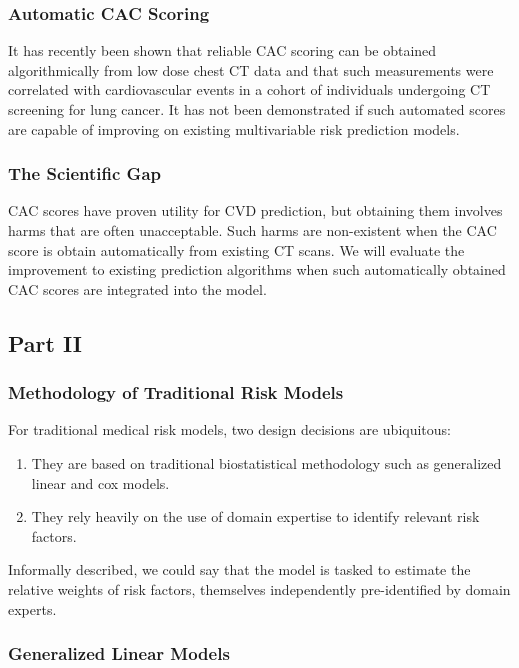 \documentclass[a4paper,12pt]{article}
\begin{document}
			\subsubsection{Automatic CAC Scoring}
			It has recently been shown that reliable CAC scoring can be obtained algorithmically from low dose chest CT data\cite{Isgum2012,Shadmi2018} and that such measurements were correlated with cardiovascular events in a cohort of individuals undergoing CT screening for lung cancer\cite{Takx2015a}. It has not been demonstrated if such automated scores are capable of improving on existing multivariable risk prediction models\cite{Force2018}.
			
			\subsubsection{The Scientific Gap}
			CAC scores have proven utility for CVD prediction, but obtaining them involves harms that are often unacceptable. Such harms are non-existent when the CAC score is obtain automatically from existing CT scans. We will evaluate the improvement to existing prediction algorithms when such automatically obtained CAC scores are integrated into the model.
			
		\subsection{Part II}
		
			\subsubsection{Methodology of Traditional Risk Models}
		
			For traditional medical risk models, two design decisions are ubiquitous\cite{Weng2017}:
			\begin{enumerate}
				\item They are based on traditional biostatistical methodology such as generalized linear and cox models.
				\item They rely heavily on the use of domain expertise to identify relevant risk factors.
			\end{enumerate}
		
			Informally described, we could say that the model is tasked to estimate the relative weights of risk factors, themselves independently pre-identified by domain experts.
		
			\subsubsection{Generalized Linear Models}
			
\end{document}
